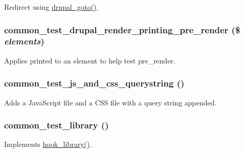 \label{common__test_8module_a395b0f500add60064382c0a497818c9c}
Redirect using \hyperlink{group__http__handling_ga5b68d7a934713d1d623b2b32a732235d}{drupal\_\-goto()}. \hypertarget{common__test_8module_a6bd7008e00a42dda50d7e4aeb06781bd}{
\subsubsection[{common\_\-test\_\-drupal\_\-render\_\-printing\_\-pre\_\-render}]{\setlength{\rightskip}{0pt plus 5cm}common\_\-test\_\-drupal\_\-render\_\-printing\_\-pre\_\-render (\$ {\em elements})}}
\label{common__test_8module_a6bd7008e00a42dda50d7e4aeb06781bd}
Applies printed to an element to help test pre\_\-render. \hypertarget{common__test_8module_abc4014dbd035130749965918d7ad1e04}{
\subsubsection[{common\_\-test\_\-js\_\-and\_\-css\_\-querystring}]{\setlength{\rightskip}{0pt plus 5cm}common\_\-test\_\-js\_\-and\_\-css\_\-querystring ()}}
\label{common__test_8module_abc4014dbd035130749965918d7ad1e04}
Adds a JavaScript file and a CSS file with a query string appended. \hypertarget{common__test_8module_ad3142c4a59e048196244a5e1e07fd60d}{
\subsubsection[{common\_\-test\_\-library}]{\setlength{\rightskip}{0pt plus 5cm}common\_\-test\_\-library ()}}
\label{common__test_8module_ad3142c4a59e048196244a5e1e07fd60d}
Implements \hyperlink{group__hooks_ga6bf3f83fa2e373836f5aa78fd143d1cd}{hook\_\-library()}.

